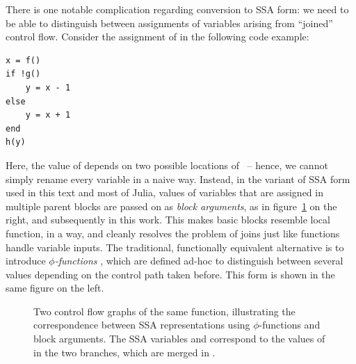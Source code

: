 There is one notable complication regarding conversion to SSA form: we need to be able to
distinguish between assignments of variables arising from \enquote{joined} control flow.  Consider
the assignment of  in the following code example:
\begin{lstlisting}
x = f()
if !g()
    y = x - 1
else
    y = x + 1
end
h(y)
\end{lstlisting}
Here, the value of  depends on two possible locations of ~-- hence, we cannot
simply rename every variable in a naive way.  Instead, in the variant of SSA form used in this text
and most of Julia, values of variables that are assigned in multiple parent blocks are passed on as
\emph{block arguments}, as in figure~\ref{fig:ssa-phi} on the right, and subsequently in this work.
This makes basic blocks resemble local function, in a way, and cleanly resolves the problem of joins
just like functions handle variable inputs.  The traditional, functionally equivalent alternative is
to introduce \emph{\(\phi\)-functions} \parencite{rosen1988global}, which are defined ad-hoc to
distinguish between several values depending on the control path taken before.  This form is shown
in the same figure on the left.

\begin{figure}[t]
  \centering
  \hfill
  \hfill
  \hfill\null
  \caption{Two control flow graphs of the same function, illustrating the correspondence between SSA
    representations using \(\phi\)-functions and block arguments.  The SSA variables
    \protect{} and \protect{} correspond to the values of \protect{} in the
    two branches, which are merged in \protect{}.}
  \label{fig:ssa-phi}
\end{figure}

